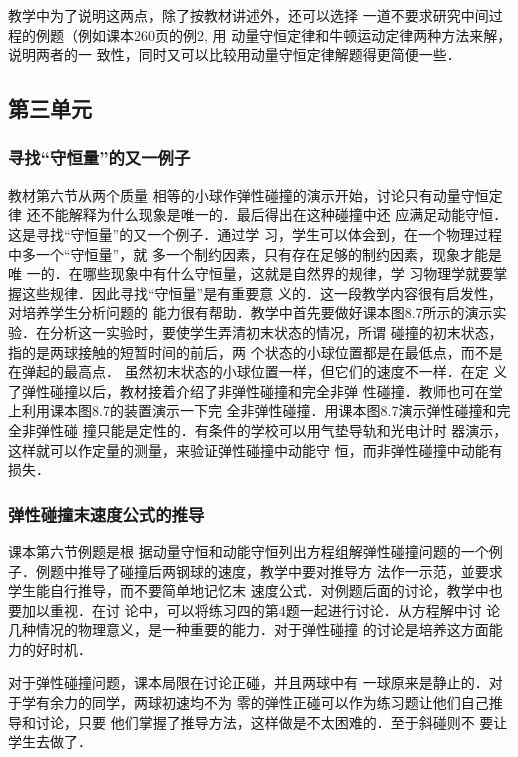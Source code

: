 教学中为了说明这两点，除了按教材讲述外，还可以选择
一道不要求研究中间过程的例题（例如课本260页的例2, 用
动量守恒定律和牛顿运动定律两种方法来解，说明两者的一
致性，同时又可以比较用动量守恒定律解题得更简便一些．

\subsection{第三单元}
\subsubsection{寻找“守恒量”的又一例子}

教材第六节从两个质量
相等的小球作弹性碰撞的演示开始，讨论只有动量守恒定律
还不能解释为什么现象是唯一的．最后得出在这种碰撞中还
应满足动能守恒．这是寻找“守恒量”的又一个例子．通过学
习，学生可以体会到，在一个物理过程中多一个“守恒量”，就
多一个制约因素，只有存在足够的制约因素，现象才能是唯
一的．在哪些现象中有什么守恒量，这就是自然界的规律，学
习物理学就要掌握这些规律．因此寻找“守恒量”是有重要意
义的．这一段教学内容很有启发性，对培养学生分析问题的
能力很有帮助．教学中首先要做好课本图8.7所示的演示实
验．在分析这一实验时，要使学生弄清初末状态的情况，所谓
碰撞的初末状态，指的是两球接触的短暂时间的前后，两
个状态的小球位置都是在最低点，而不是在弹起的最高点．
虽然初末状态的小球位置一样，但它们的速度不一样．在定
义了弹性碰撞以后，教材接着介绍了非弹性碰撞和完全非弹
性碰撞．教师也可在堂上利用课本图8.7的装置演示一下完
全非弹性碰撞．用课本图8.7演示弹性碰撞和完全非弹性碰
撞只能是定性的．有条件的学校可以用气垫导轨和光电计时
器演示，这样就可以作定量的测量，来验证弹性碰撞中动能守
恒，而非弹性碰撞中动能有损失．

\subsubsection{弹性碰撞末速度公式的推导}

课本第六节例题是根
据动量守恒和动能守恒列出方程组解弹性碰撞问题的一个例
子．例题中推导了碰撞后两钢球的速度，教学中要对推导方
法作一示范，並要求学生能自行推导，而不要简单地记忆末
速度公式．对例题后面的讨论，教学中也要加以重视．在讨
论中，可以将练习四的第4题一起进行讨论．从方程解中讨
论几种情况的物理意义，是一种重要的能力．对于弹性碰撞
的讨论是培养这方面能力的好时机．

对于弹性碰撞问题，课本局限在讨论正碰，并且两球中有
一球原来是静止的．对于学有余力的同学，两球初速均不为
零的弹性正碰可以作为练习题让他们自己推导和讨论，只要
他们掌握了推导方法，这样做是不太困难的．至于斜碰则不
要让学生去做了．

